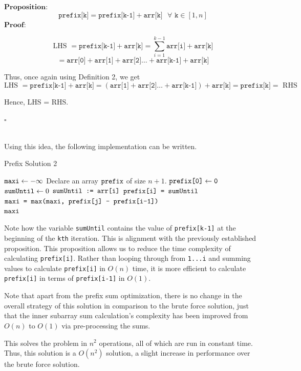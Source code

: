 \noindent $\textbf{Proposition:}$
$$\texttt{prefix[k]} = \texttt{prefix[k-1]} + \texttt{arr[k]} \text{   } \forall \texttt{ k} \in [1, n]$$
\noindent $\textbf{Proof:}$

$$\text{LHS } = \texttt{prefix[k-1]} + \texttt{arr[k]}= \sum_{i=1}^{k-1} \texttt{arr[i]} + \texttt{arr[k]}$$
$$ = \texttt{arr[0]} + \texttt{arr[1]} + \texttt{arr[2]} \dots + \texttt{arr[k-1]} + \texttt{arr[k]}$$

Thus, once again using Definition 2, we get $$\text{LHS } = \texttt{prefix[k-1]} + \texttt{arr[k]} = (\texttt{arr[1]} + \texttt{arr[2]} \dots + \texttt{arr[k-1]}) + \texttt{arr[k]} = \texttt{prefix[k]} = \text{ RHS}$$

Hence, LHS = RHS.

\noindent $\square$

\noindent \\ Using this idea, the following implementation can be written. 

\begin{algorithm}
\caption{Prefix Solution 2}\label{prefix}
\begin{algorithmic}[1]
\State $\texttt{maxi} \gets -\infty$ 
\State Declare an array $\texttt{prefix}$ of size $n+1$.
\State $\texttt{prefix[0]} \gets \texttt{0}$ 
\State $\texttt{sumUntil} \gets 0$
    \State $\texttt{sumUntil := arr[i]}$
    \State $\texttt{prefix[i] = sumUntil}$
\EndFor
{}
        \State $\texttt{maxi = max(maxi, prefix[j] - prefix[i-1])}$
    \EndFor
\EndFor 
\State \\ \Return $\texttt{maxi}$
\end{algorithmic}
\end{algorithm}

\noindent Note how the variable \texttt{sumUntil} contains the value of \texttt{prefix[k-1]} at the beginning of the \texttt{kth} iteration. This is alignment with the previously established proposition. This proposition allows us to reduce the time complexity of calculating \texttt{prefix[i]}. Rather than looping through from \texttt{1...i} and summing values to calculate \texttt{prefix[i]} in $O(n)$ time, it is more efficient to calculate \texttt{prefix[i]} in terms of \texttt{prefix[i-1]} in $O(1).$ \newline

\noindent Note that apart from the prefix sum optimization, there is no change in the overall strategy of this solution in comparison to the brute force solution, just that the inner subarray sum calculation's complexity has been improved from $O(n)$ to $O(1)$ via pre-processing the sums. \newline

\noindent This solves the problem in $n^2$ operations, all of which are run in constant time. Thus, this solution is a $O(n^2)$ solution, a slight increase in performance over the brute force solution.

